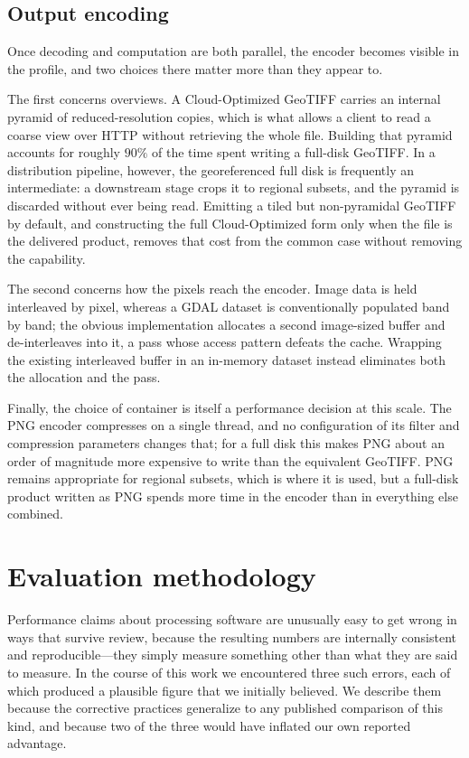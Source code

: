 \documentclass{ametsocV6.1}
\begin{document}
\subsection{Output encoding}
\label{sec:output}

Once decoding and computation are both parallel, the encoder becomes visible in
the profile, and two choices there matter more than they appear to.

The first concerns overviews. A Cloud-Optimized GeoTIFF carries an internal
pyramid of reduced-resolution copies, which is what allows a client to read a
coarse view over HTTP without retrieving the whole file. Building that pyramid
accounts for roughly $90\%$ of the time spent writing a full-disk GeoTIFF. In a
distribution pipeline, however, the georeferenced full disk is frequently an
intermediate: a downstream stage crops it to regional subsets, and the pyramid
is discarded without ever being read. Emitting a tiled but non-pyramidal
GeoTIFF by default, and constructing the full Cloud-Optimized form only when
the file is the delivered product, removes that cost from the common case
without removing the capability.

The second concerns how the pixels reach the encoder. Image data is held
interleaved by pixel, whereas a GDAL dataset is conventionally populated band
by band; the obvious implementation allocates a second image-sized buffer and
de-interleaves into it, a pass whose access pattern defeats the cache. Wrapping
the existing interleaved buffer in an in-memory dataset instead eliminates both
the allocation and the pass.

Finally, the choice of container is itself a performance decision at this
scale. The PNG encoder compresses on a single thread, and no configuration of
its filter and compression parameters changes that; for a full disk this makes
PNG about an order of magnitude more expensive to write than the equivalent
GeoTIFF. PNG remains appropriate for regional subsets, which is where it is
used, but a full-disk product written as PNG spends more time in the encoder
than in everything else combined.

\section{Evaluation methodology}
\label{sec:methodology}

Performance claims about processing software are unusually easy to get wrong in
ways that survive review, because the resulting numbers are internally
consistent and reproducible---they simply measure something other than what
they are said to measure. In the course of this work we encountered three such
errors, each of which produced a plausible figure that we initially believed.
We describe them because the corrective practices generalize to any published
comparison of this kind, and because two of the three would have inflated our
own reported advantage.
\end{document}
